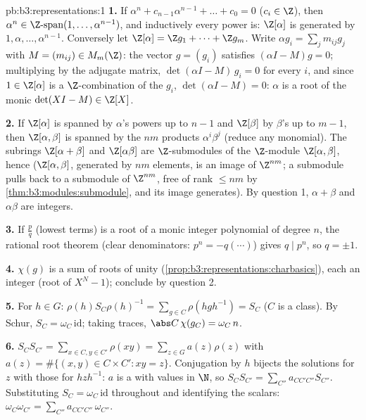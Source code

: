 \begin{solution}{pb:b3:representations:1}
\textbf{1.} If $\alpha^n + c_{n-1}\alpha^{n-1} + \dots + c_0 =
0$ ($c_i \in \Z$), then $\alpha^n \in \Z\text{-span}(1, \dots,
\alpha^{n-1})$, and inductively every power is: $\Z[\alpha]$ is
generated by $1, \alpha, \dots, \alpha^{n-1}$. Conversely let
$\Z[\alpha] = \Z g_1 + \dots + \Z g_m$. Write $\alpha g_i =
\sum_j m_{ij}g_j$ with $M = (m_{ij}) \in M_m(\Z)$: the vector
$g = (g_i)$ satisfies $(\alpha I - M)g = 0$; multiplying by the
adjugate matrix, $\det(\alpha I - M)\,g_i = 0$ for every $i$,
and since $1 \in \Z[\alpha]$ is a $\Z$-combination of the
$g_i$, $\det(\alpha I - M) = 0$: $\alpha$ is a root of the
monic $\det(XI - M) \in \Z[X]$.

\textbf{2.} If $\Z[\alpha]$ is spanned by $\alpha$'s powers up
to $n-1$ and $\Z[\beta]$ by $\beta$'s up to $m - 1$, then
$\Z[\alpha,\beta]$ is spanned by the $nm$ products
$\alpha^i\beta^j$ (reduce any monomial). The subrings
$\Z[\alpha + \beta]$ and $\Z[\alpha\beta]$ are $\Z$-submodules
of the  $\Z$-module $\Z[\alpha, \beta]$,
hence  ($\Z[\alpha,\beta]$, generated by
$nm$ elements, is an image of $\Z^{nm}$; a submodule pulls
back to a submodule of $\Z^{nm}$, free of rank $\leq nm$ by
\cref{thm:b3:modules:submodule}, and its image generates). By
question 1, $\alpha + \beta$ and $\alpha\beta$ are 
integers.

\textbf{3.} If $\frac pq$ (lowest terms) is a root of a monic
integer polynomial of degree $n$, the rational root theorem
(clear denominators: $p^n = -q(\cdots)$) gives $q \mid p^n$,
so $q = \pm1$.

\textbf{4.} $\chi(g)$ is a sum of roots of unity
(\cref{prop:b3:representations:charbasics}), each an 
integer (root of $X^N - 1$); conclude by question 2.

\textbf{5.} For $h \in G$: $\rho(h)S_C\rho(h)^{-1} = \sum_{g\in
C}\rho(hgh^{-1}) = S_C$ ($C$ is a class). By Schur, $S_C =
\omega_C\,\mathrm{id}$; taking traces, $\abs C\,\chi(g_C) =
\omega_C\, n$.

\textbf{6.} $S_CS_{C'} = \sum_{x \in C, y \in C'}\rho(xy) =
\sum_{z \in G} a(z)\rho(z)$ with $a(z) = \#\{(x,y) \in C\times
C' : xy = z\}$. Conjugation by $h$ bijects the solutions for
$z$ with those for $hzh^{-1}$: $a$ is a  with
values in $\N$, so $S_CS_{C'} = \sum_{C''}a_{CC'C''}S_{C''}$.
Substituting $S_C = \omega_C\,\mathrm{id}$ throughout and
identifying the scalars:
$\omega_C\omega_{C'} = \sum_{C''}a_{CC'C''}\,\omega_{C''}$.


\end{solution}
